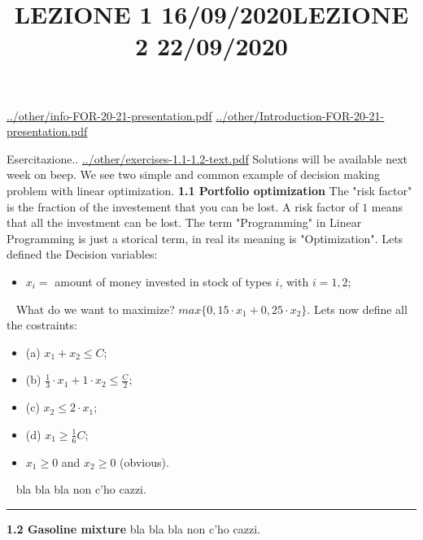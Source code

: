\title{LEZIONE 1 16/09/2020}\newline
\newline
\url{../other/info-FOR-20-21-presentation.pdf}\newline
\url{../other/Introduction-FOR-20-21-presentation.pdf}
\newpage
\title{LEZIONE 2 22/09/2020}\newline
\newline
Esercitazione..\newline
\newline
\url{../other/exercises-1.1-1.2-text.pdf}\newline
\newline
Solutions will be available next week on beep.\newline
\newline
We see two simple and common example of decision making problem with linear optimization.\newline
\newline
\textbf{1.1 Portfolio optimization}\newline
\newline
The "risk factor" is the fraction of the investement that you can be lost. A risk factor of $1$ means that all the investment can be lost.\newline
\newline
The term "Programming" in Linear Programming is just a storical term, in real its meaning is "Optimization".\newline
\newline
Lets defined the Decision variables:
\begin{itemize}
    \item $x_i =$ amount of money invested in stock of types $i$, with $i = 1,2$;
\end{itemize}
\ \newline
What do we want to maximize? $max \{ 0,15 \cdot x_1 + 0,25 \cdot x_2 \}$.
\newline
\newline
Lets now define all the costraints:
\begin{itemize}
    \item (a) $x_1 + x_2 \leq C$;
    \item (b) $\frac{1}{3} \cdot  x_1 + 1 \cdot x_2 \leq \frac{C}{2}$;
    \item (c) $x_2 \leq 2 \cdot x_1$;
    \item (d) $x_1 \geq \frac{1}{6} C$;
    \item $x_1 \geq 0$ and $x_2 \geq 0$ (obvious).
\end{itemize}
\ \newline
\newline
bla bla bla non c'ho cazzi.
\newline
\newline
\rule{\textwidth}{0,4pt}
\newline
\newline
\textbf{1.2 Gasoline mixture}\newline
\newline
bla bla bla non c'ho cazzi.